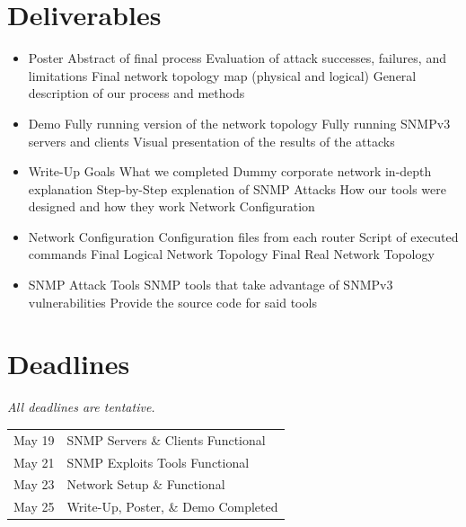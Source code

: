 \documentclass[pdftex, 11pt]{article}
\begin{document}
\section{Deliverables}

\begin{itemize}
\item Poster
  \subitem Abstract of final process
  \subitem Evaluation of attack successes, failures, and limitations
  \subitem Final network topology map (physical and logical)
  \subitem General description of our process and methods

\item Demo
  \subitem Fully running version of the network topology %
  \subitem Fully running SNMPv3 servers and clients
  \subitem Visual presentation of the results of the attacks

\item Write-Up
  \subitem Goals
  \subitem What we completed
  \subitem Dummy corporate network in-depth explanation
  \subitem Step-by-Step explenation of SNMP Attacks
  \subitem How our tools were designed and how they work
  \subitem Network Configuration

\item Network Configuration
  \subitem Configuration files from each router
  \subitem Script of executed commands
  \subitem Final Logical Network Topology
  \subitem Final Real Network Topology

\item SNMP Attack Tools
  \subitem SNMP tools that take advantage of SNMPv3  vulnerabilities
  \subitem Provide the source code for said tools

\end{itemize}

\section{Deadlines}
\textit{All deadlines are tentative.}

\begin{center}
\begin{tabular}{l l}
  May 19 & SNMP Servers \& Clients Functional \\
  May 21 & SNMP Exploits Tools Functional \\
  May 23 & Network Setup \& Functional \\
  May 25 & Write-Up, Poster, \& Demo Completed \\
\end{tabular}
\end{center}
\end{document}
